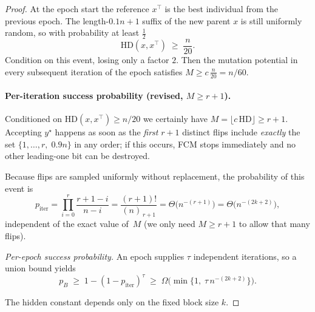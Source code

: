 \begin{proof}
	At the epoch start the reference \(x^\top\) is the best individual from the
	previous epoch.  
	The length-\(0.1n+1\) suffix of the new parent \(x\) is still uniformly random,
	so with probability at least \(\tfrac12\)
	\[
	\mathrm{HD}(x,x^\top)\;\ge\;\frac{n}{20}.
	\]
	Condition on this event, losing only a factor \(2\).
	Then the mutation potential in every subsequent
	iteration of the epoch satisfies
	\(
	M\ge c\,\tfrac{n}{20} = n/60.
	\)
	
	\paragraph*{Per-iteration success probability (revised, $M\ge r{+}1$).}
	Conditioned on $\mathrm{HD}(x,x^\top)\ge n/20$ we certainly have
	$M=\lfloor c\,\mathrm{HD}\rfloor\ge r+1$.
	Accepting $y^\star$ happens as soon as the \emph{first} $r{+}1$ distinct flips
	include \emph{exactly} the set
	\(\{1,\dots,r,\;0.9n\}\)
	in any order; if this occurs, FCM stops immediately and no other
	leading-one bit can be destroyed.
	
	Because flips are sampled uniformly without replacement, the probability of
	this event is
	\[
	p_{\text{iter}}
	=\prod_{i=0}^{r}\frac{r+1-i}{n-i}
	=\frac{(r+1)!}{(n)_{\,r+1}}
	=\Theta\!\bigl(n^{-(r+1)}\bigr)
	=\Theta\!\bigl(n^{-(2k+2)}\bigr),
	\]
	independent of the exact value of~$M$ (we only need $M\ge r{+}1$ to allow that
	many flips).
	
	\medskip\noindent
	\emph{Per-epoch success probability.}
	An epoch supplies \(\tau\) independent iterations, so a union bound yields
	\[
	p_B
	\;\ge\;
	1-(1-p_{\text{iter}})^{\tau}
	\;\ge\;
	\Omega\!\bigl(\min\{1,\;\tau\,n^{-(2k+2)}\}\bigr).
	\]
	
	\noindent
	The hidden constant depends only on the fixed block size \(k\).
\end{proof}


